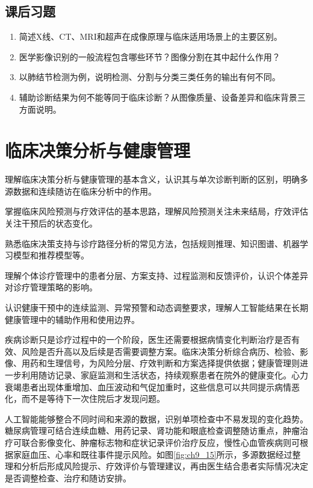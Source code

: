 \bigskip
\subsection*{课后习题}
\begin{enumerate}
\setlength{\itemsep}{3pt}

\item 简述X线、CT、MRI和超声在成像原理与临床适用场景上的主要区别。
\item 医学影像识别的一般流程包含哪些环节？图像分割在其中起什么作用？
\item 以肺结节检测为例，说明检测、分割与分类三类任务的输出有何不同。
\item 辅助诊断结果为何不能等同于临床诊断？从图像质量、设备差异和临床背景三方面说明。
\end{enumerate}


\clearpage
\section{临床决策分析与健康管理}

\begin{sectionkeypoints}
\item 理解临床决策分析与健康管理的基本含义，认识其与单次诊断判断的区别，明确多源数据和连续随访在临床分析中的作用。
\item 掌握临床风险预测与疗效评估的基本思路，理解风险预测关注未来结局，疗效评估关注干预后的状态变化。
\item 熟悉临床决策支持与诊疗路径分析的常见方法，包括规则推理、知识图谱、机器学习模型和推荐模型等。
\item 理解个体诊疗管理中的患者分层、方案支持、过程监测和反馈评价，认识个体差异对诊疗管理策略的影响。
\item 认识健康干预中的连续监测、异常预警和动态调整要求，理解人工智能结果在长期健康管理中的辅助作用和使用边界。
\end{sectionkeypoints}

疾病诊断只是诊疗过程中的一个阶段，医生还需要根据病情变化判断治疗是否有效、风险是否升高以及后续是否需要调整方案。临床决策分析综合病历、检验、影像、用药和生理信号，为风险分层、疗效判断和方案选择提供依据；健康管理则进一步利用随访记录、家庭监测和生活状态，持续观察患者在院外的健康变化。心力衰竭患者出现体重增加、血压波动和气促加重时，这些信息可以共同提示病情恶化，而不是等待下一次住院后才发现问题。

人工智能能够整合不同时间和来源的数据，识别单项检查中不易发现的变化趋势。糖尿病管理可结合连续血糖、用药记录、肾功能和眼底检查调整随访重点，肿瘤治疗可联合影像变化、肿瘤标志物和症状记录评价治疗反应，慢性心血管疾病则可根据家庭血压、心率和既往事件提示风险。如图\ref{fig:ch9_15}所示，多源数据经过整理和分析后形成风险提示、疗效评价与管理建议，再由医生结合患者实际情况决定是否调整检查、治疗和随访安排。

